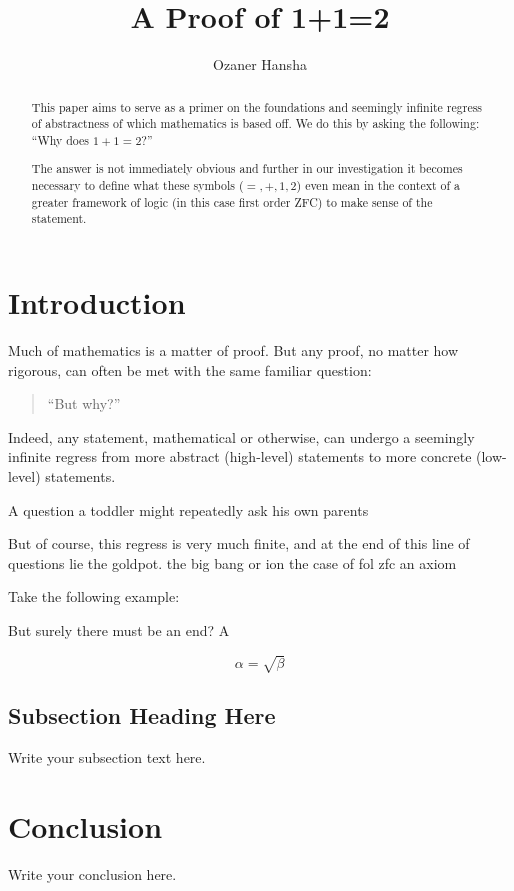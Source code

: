 \documentclass{article}
\begin{document}
\title{A Proof of 1+1=2}
\author{Ozaner Hansha}
\maketitle

\begin{abstract}
This paper aims to serve as a primer on the foundations and seemingly infinite regress of abstractness of which mathematics is based off. We do this by asking the following: ``Why does $1+1=2$?''

The answer is not immediately obvious and further in our investigation it becomes necessary to define what these symbols ($=,+,1,2$) even mean in the context of a greater framework of logic (in this case first order ZFC) to make sense of the statement.
\end{abstract}

\section{Introduction}
Much of mathematics is a matter of proof. But any proof, no matter how rigorous, can often be met with the same familiar question:

\begin{quotation}
  \begin{center}
    ``But why?''
  \end{center}
\end{quotation}

Indeed, any statement, mathematical or otherwise, can undergo a seemingly infinite regress from more abstract (high-level) statements to more concrete (low-level) statements.

A question a toddler might repeatedly ask his own parents

\begin{quotation}

\end{quotation}

But of course, this regress is very much finite, and at the end of this line of questions lie the goldpot. the big bang or ion the case of fol zfc an axiom

Take the following example:


But surely there must be an end? A

\begin{equation}
    \label{simple_equation}
    \alpha = \sqrt{ \beta }
\end{equation}

\subsection{Subsection Heading Here}
Write your subsection text here.

\section{Conclusion}
Write your conclusion here.
\end{document}
